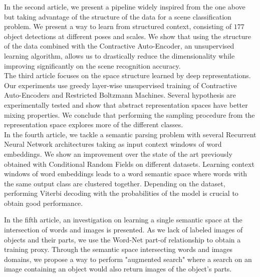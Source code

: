 In the second article, we present a pipeline widely inspired from the one above
but taking advantage of the structure of the data for a scene classification
problem. We present a way to learn from structured context, consisting of $177$
object detections at different poses and scales. We show that using the
structure of the data combined with the Contractive Auto-Encoder, an
unsupervised learning algorithm, 
allows us to drastically reduce the dimensionality while improving
significantly on the scene recognition accuracy. 
\\

\vspace{-0.2cm}
The third article focuses on the space structure learned by deep
representations. Our experiments use greedy layer-wise unsupervised training of
Contractive Auto-Encoders and Restricted Boltzmann Machines. Several hypothesis
are experimentally tested and show that abstract representation spaces have
better mixing properties. We conclude that performing the sampling procedure
from the representation space explores more of the different classes.
\\

\vspace{-0.2cm}
In the fourth article, we tackle a semantic parsing problem with several
Recurrent Neural Network architectures taking as input context windows of word
embeddings. We show an improvement over the state of the art previously
obtained with Conditional Random Fields on different datasets. Learning context
windows of word embeddings leads to a
word semantic space where words with the same output class are
clustered together. Depending on the dataset, performing Viterbi decoding with
the probabilities of the model is crucial to obtain good performance.

In the fifth article, an investigation on learning a single semantic space at
the intersection of words and images is presented. As we lack of labeled images
of objects and their parts, we use the Word-Net part-of relationship to obtain
a training proxy. Through the semantic space intersecting words and images
domains, we propose a way to perform "augmented search" where a search on an
image containing an object would also return images of the object's parts.

